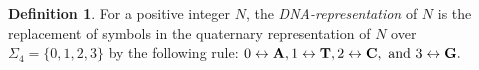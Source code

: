 \documentclass[conference]{IEEEtran}
\theoremstyle{plain}
\theoremstyle{definition}
\newtheorem{definition}{Definition}
\begin{document}

\begin{definition}
For a positive integer $N$, the {\em DNA-representation} of $N$ is the replacement of symbols in the quaternary representation of $N$ over $\Sigma_4 = \{0,1,2,3\}$ by the following rule:  $0  \leftrightarrow {\bf A}, 1  \leftrightarrow {\bf T}, 2  \leftrightarrow {\bf C}, \text{ and } 3  \leftrightarrow {\bf G}.$
\end{definition} 
\end{document}
